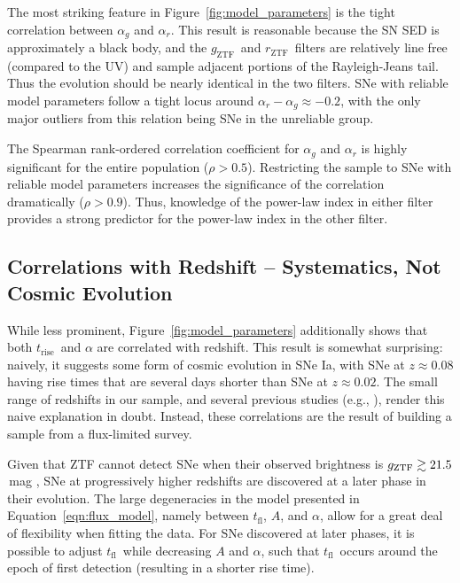 \documentclass[twocolumn]{aastex63}
\newcommand{\rztf}{$r_\mathrm{ZTF}$}
\newcommand{\gztf}{$g_\mathrm{ZTF}$}
\newcommand{\tfl}{$t_\mathrm{fl}$}
\newcommand{\trise}{$t_\mathrm{rise}$}
\begin{document}
The most striking feature in Figure~\ref{fig:model_parameters} is the tight
correlation between $\alpha_g$ and $\alpha_r$. This result is
reasonable because the SN SED is approximately a
black body, and the \gztf\ and \rztf\ filters are relatively line free
(compared to the UV) and sample adjacent portions of the Rayleigh-Jeans tail.
Thus the evolution should be nearly identical in the two filters. SNe with
reliable model parameters follow a tight locus around $\alpha_r - \alpha_g
\approx -0.2$, with the only major outliers from this relation being SNe in
the unreliable group.

The Spearman rank-ordered correlation coefficient for $\alpha_g$ and
$\alpha_r$ is highly significant for the entire population ($\rho > 0.5$).
Restricting the sample to SNe with reliable model parameters increases the
significance of the correlation dramatically ($\rho > 0.9$). Thus, knowledge
of the power-law index in either filter provides a strong predictor for the
power-law index in the other filter.

\subsection{Correlations with Redshift -- Systematics, Not Cosmic Evolution}\label{sec:redshift_correlations}

While less prominent, Figure~\ref{fig:model_parameters} additionally shows
that both \trise\ and $\alpha$ are correlated with redshift. This result is
somewhat surprising: naively, it suggests some form of cosmic evolution in SNe
Ia, with SNe at $z \approx 0.08$ having rise times that are several days
shorter than SNe at $z \approx 0.02$. The small range of redshifts in our
sample, and several previous studies (e.g.,
\citealt{Aldering00,Conley06,Jones19}), render this naive explanation in
doubt. Instead, these correlations are the result of building a sample from a
flux-limited survey.

Given that ZTF cannot detect SNe when their observed brightness is
$g_\mathrm{ZTF} \gtrsim 21.5$\,mag \citep{Masci19,Bellm19}, SNe at progressively
higher redshifts are discovered at a later phase in their evolution. The large
degeneracies in the model presented in Equation~\ref{eqn:flux_model}, namely
between \tfl, $A$, and $\alpha$, allow for a great deal of flexibility when
fitting the data. For SNe discovered at later phases, it is possible to adjust
\tfl\ while decreasing $A$ and $\alpha$, such that \tfl\ occurs around the
epoch of first detection (resulting in a shorter rise time).
\end{document}
